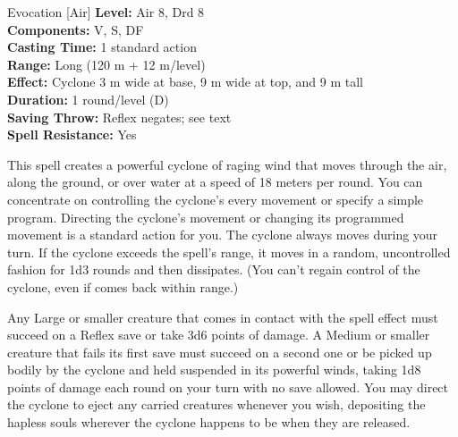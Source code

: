 {Evocation [Air]}
{
	\textbf{Level:}
	Air 8, Drd 8\\
	\textbf{Components:}
	V, S, DF\\
	\textbf{Casting Time:}
	1 standard action\\
	\textbf{Range:}
	Long (120 m + 12 m/level)\\
	\textbf{Effect:}
	Cyclone 3 m wide at base, 9 m wide at top, and 9 m tall\\
	\textbf{Duration:}
	1 round/level (D)\\
	\textbf{Saving Throw:}
	Reflex negates; see text\\
	\textbf{Spell Resistance:}
	Yes\\
}
{
	This spell creates a powerful cyclone of raging wind that moves through the air, along the ground, or over water at a speed of 18 meters per round. You can concentrate on controlling the cyclone's every movement or specify a simple program. Directing the cyclone's movement or changing its programmed movement is a standard action for you. The cyclone always moves during your turn. If the cyclone exceeds the spell's range, it moves in a random, uncontrolled fashion for 1d3 rounds and then dissipates. (You can't regain control of the cyclone, even if comes back within range.)

	Any Large or smaller creature that comes in contact with the spell effect must succeed on a Reflex save or take 3d6 points of damage. A Medium or smaller creature that fails its first save must succeed on a second one or be picked up bodily by the cyclone and held suspended in its powerful winds, taking 1d8 points of damage each round on your turn with no save allowed. You may direct the cyclone to eject any carried creatures whenever you wish, depositing the hapless souls wherever the cyclone happens to be when they are released.

}
